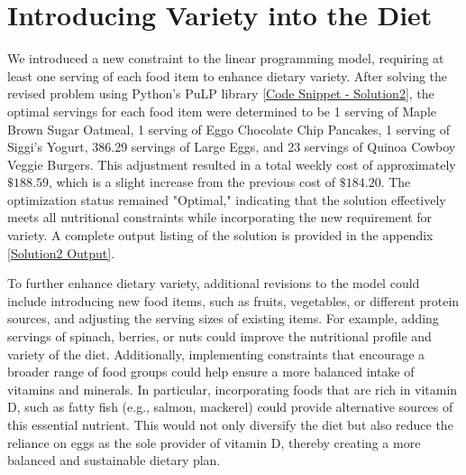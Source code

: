 \documentclass{article}
\begin{document}
\section{Introducing Variety into the Diet}
We introduced a new constraint to the linear programming model, requiring at least one serving of each food item to enhance dietary variety. After solving the revised problem using Python's PuLP library \ref{Code Snippet - Solution2}, the optimal servings for each food item were determined to be 1 serving of Maple Brown Sugar Oatmeal, 1 serving of Eggo Chocolate Chip Pancakes, 1 serving of Siggi’s Yogurt, 386.29 servings of Large Eggs, and 23 servings of Quinoa Cowboy Veggie Burgers. This adjustment resulted in a total weekly cost of approximately $\$188.59$, which is a slight increase from the previous cost of $\$184.20$. The optimization status remained "Optimal," indicating that the solution effectively meets all nutritional constraints while incorporating the new requirement for variety. A complete output listing of the solution is provided in the appendix \ref{Solution2 Output}.

To further enhance dietary variety, additional revisions to the model could include introducing new food items, such as fruits, vegetables, or different protein sources, and adjusting the serving sizes of existing items. For example, adding servings of spinach, berries, or nuts could improve the nutritional profile and variety of the diet. Additionally, implementing constraints that encourage a broader range of food groups could help ensure a more balanced intake of vitamins and minerals. In particular, incorporating foods that are rich in vitamin D, such as fatty fish (e.g., salmon, mackerel) could provide alternative sources of this essential nutrient. This would not only diversify the diet but also reduce the reliance on eggs as the sole provider of vitamin D, thereby creating a more balanced and sustainable dietary plan.
\end{document}
